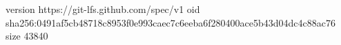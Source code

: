 version https://git-lfs.github.com/spec/v1
oid sha256:0491af5cb48718c8953f0e993caec7c6eeba6f280400ace5b43d04dc4c88ac76
size 43840
